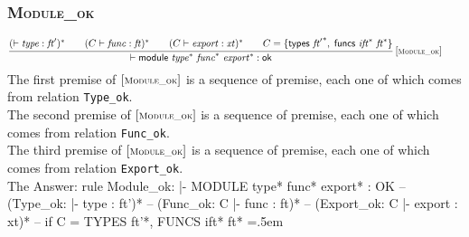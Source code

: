 \documentclass{article}
\newenvironment{lcverbatim}
 {\SaveVerbatim{cverb}}
 {\endSaveVerbatim
  \flushleft\fboxrule=0pt\fboxsep=.5em
  \colorbox{cverbbg}{%
    \makebox[\dimexpr\linewidth-2\fboxsep][l]{\BUseVerbatim{cverb}}%
  }
  \endflushleft
}
\newcommand\K[1]{\texttt{#1}}
\begin{document}
\subsubsection{\normalfont\normalsize\textsc {Module\_ok}}
$$
\begin{array}{@{}c@{}}\displaystyle
	\frac{
		({ \vdash }\;{\mathit{type}} : {\mathit{ft}'})^\ast
		\qquad
		(C \vdash {\mathit{func}} : {\mathit{ft}})^\ast
		\qquad
		(C \vdash {\mathit{export}} : {\mathit{xt}})^\ast
		\qquad
		C = \{ \begin{array}[t]{@{}l@{}}
			\mathsf{types}~{{\mathit{ft}'}^\ast},\; \mathsf{funcs}~{{\mathit{ift}}^\ast}~{{\mathit{ft}}^\ast} \}\end{array}
	}{
		{ \vdash }\;\mathsf{module}~{{\mathit{type}}^\ast}~{{\mathit{func}}^\ast}~{{\mathit{export}}^\ast} : \mathsf{ok}
	} \, {[\textsc{\scriptsize Module\_ok}]}
	\qquad
\end{array}
$$
The first premise of $[\textsc{\scriptsize Module\_ok}]$ is a sequence of premise, each one of which comes from relation \K{Type\_ok}. \\
The second premise of $[\textsc{\scriptsize Module\_ok}]$ is a sequence of premise, each one of which comes from relation \K{Func\_ok}. \\
The third premise of $[\textsc{\scriptsize Module\_ok}]$ is a sequence of premise, each one of which comes from relation \K{Export\_ok}. \\
The 
{\color{red}
	Answer:
	\begin{lcverbatim}
rule Module_ok:
  |- MODULE type* func* export* : OK
  -- (Type_ok: |- type : ft')*
  -- (Func_ok: C |- func : ft)*
  -- (Export_ok: C |- export : xt)*
  -- if C = {TYPES ft'*, FUNCS ift* ft*}
	\end{lcverbatim}
}
\end{document}
